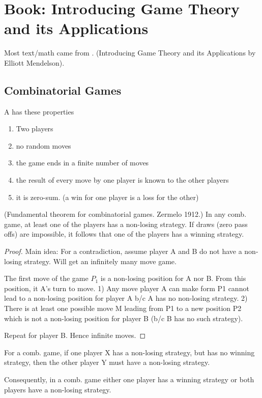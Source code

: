  \chapter{Book: Introducing Game Theory and its Applications}

Most text/math came from \cite{mendelsonGameTheory}. (Introducing Game Theory and its Applications by Elliott Mendelson).


\section{Combinatorial Games}


\begin{definition}
A  has these properties
\begin{enumerate}
	\item Two players
	\item no random moves
	\item the game ends in a finite number of moves
	\item the result of every move by one player is known to the other players
	\item it is zero-sum. (a win for one player is a loss for the other)
\end{enumerate}
\end{definition}

\begin{theorem}(Fundamental theorem for combinatorial games. Zermelo 1912.)
 In any comb. game, at least one of the players has a non-losing strategy. If draws (zero pass offs) are impossible, it follows that one of the players has a winning strategy.
\end{theorem}

\begin{proof}
Main idea: For a contradiction, assume player A and B do not have a non-losing strategy. Will get an infinitely many move game. 

The first move of the game $P_1$ is a non-losing position for A nor B. From this position, it A's turn to move.  1) Any move player A can make form P1 cannot lead to a non-losing position for player A b/c A has no non-losing strategy. 2) There is at least one possible move M leading from P1 to a new position P2 which is not a non-losing position for player B (b/c B has no such strategy).

Repeat for player B. Hence infinite moves.
\end{proof}

\begin{corollary}
For a comb. game, if one player X has a non-losing strategy, but has no winning strategy, then the other player Y must have a non-losing strategy.

Consequently, in a comb. game either one player has a winning strategy or both players have a non-losing strategy.
\end{corollary}


